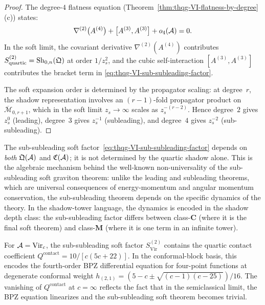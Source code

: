 \begin{proof}
The degree-$4$ flatness equation
(Theorem~\ref{thm:thqg-VI-flatness-by-degree}(c)) states:
\[
\nabla^{(2)}\bigl(A^{(4)}\bigr)
+ \bigl[A^{(3)}, A^{(3)}\bigr]
+ o_4(\mathcal{A})
= 0.
\]
In the soft limit, the covariant derivative $\nabla^{(2)}(A^{(4)})$
contributes $S^{(2)}_{\mathrm{quartic}} = \operatorname{Sh}_{0,n}(\mathfrak{Q})$
at order $1/z_s^2$, and the cubic self-interaction
$[A^{(3)}, A^{(3)}]$ contributes the bracket term in
\eqref{eq:thqg-VI-sub-subleading-factor}.

The soft expansion order is determined by the propagator scaling:
at degree~$r$, the shadow representation involves an
$(r-1)$-fold propagator product on $\overline{\mathcal{M}}_{0,r+1}$,
which in the soft limit $z_s \to \infty$ scales as
$z_s^{-(r-2)}$. Hence degree~$2$ gives $z_s^0$ (leading),
degree~$3$ gives $z_s^{-1}$ (subleading), and degree~$4$ gives
$z_s^{-2}$ (sub-subleading).
\end{proof}

\begin{remark}
\label{rem:thqg-VI-non-universality}
The sub-subleading soft factor~\eqref{eq:thqg-VI-sub-subleading-factor}
depends on \emph{both} $\mathfrak{Q}(\mathcal{A})$ and
$\mathfrak{C}(\mathcal{A})$; it is not determined by the quartic shadow
alone. This is the algebraic mechanism behind the well-known
non-universality of the sub-subleading soft graviton theorem:
unlike the leading and subleading theorems, which are universal
consequences of energy-momentum and angular momentum conservation,
the sub-subleading theorem depends on the specific dynamics of the
theory. In the shadow-tower language, the dynamics is encoded in
the shadow depth class: the sub-subleading factor differs
between class-$\mathbf{C}$ (where it is the final soft theorem)
and class-$\mathbf{M}$ (where it is one term in an infinite tower).
\end{remark}

\begin{remark}
\label{rem:thqg-VI-virasoro-bpz}
For $\mathcal{A} = \mathrm{Vir}_c$, the sub-subleading soft factor
$S^{(2)}_{\mathrm{Vir}}$ contains the quartic contact coefficient
$Q^{\mathrm{contact}} = 10/[c(5c+22)]$.
In the conformal-block basis, this encodes the fourth-order
BPZ differential equation for four-point functions at degenerate
conformal weight $h_{(2,1)} = (5-c \pm \sqrt{(c-1)(c-25)})/16$.
The vanishing of $Q^{\mathrm{contact}}$ at $c = \infty$
reflects the fact that in the semiclassical limit, the BPZ
equation linearizes and the sub-subleading soft theorem becomes
trivial.
\end{remark}

